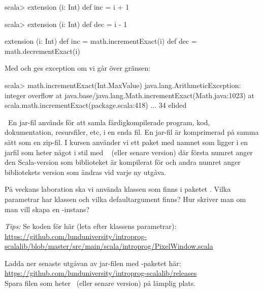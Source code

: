 \SubtaskSolved 
\begin{REPLnonum}
scala> extension (i: Int) def inc = i + 1
\end{REPLnonum}

\SubtaskSolved 
\begin{REPLnonum}
scala> extension (i: Int) def dec = i - 1
\end{REPLnonum}

\SubtaskSolved 
\begin{Code}
extension (i: Int) 
  def inc = math.incrementExact(i)
  def dec = math.decrementExact(i)
\end{Code}

\SubtaskSolved Med   och  ges exception om vi går över gränsen:
\begin{REPLnonum}
scala> math.incrementExact(Int.MaxValue)
java.lang.ArithmeticException: integer overflow
  at java.base/java.lang.Math.incrementExact(Math.java:1023)
  at scala.math.incrementExact(package.scala:418)
  ... 34 elided
\end{REPLnonum}


\QUESTEND



\QUESTBEGIN

\Task \what~En jar-fil används för att samla färdigkompilerade program, kod, dokumentation, resursfiler, etc, i en enda fil. En jar-fil är komprimerad på samma sätt som en zip-fil. I kursen använder vi ett paket med namnet  som ligger i en jarfil som heter något i stil med \LibJar~ (eller senare version) där första numret anger den Scala-version som biblioteket är kompilerat för och andra numret anger bibliotekets version som ändras vid varje ny utgåva.

\Subtask På veckans laboration ska vi använda klassen  som finns i paketet . Vilka parametrar har klassen  och vilka defaultargument finns? Hur skriver man om man vill skapa en -instans?

\emph{Tips:}  Se koden för  här (leta efter klassens parametrar): \\\url{https://github.com/lunduniversity/introprog-scalalib/blob/master/src/main/scala/introprog/PixelWindow.scala}


\Subtask Ladda ner senaste utgåvan av jar-filen med -paketet här: \\\url{https://github.com/lunduniversity/introprog-scalalib/releases}
\\ Spara filen som heter \LibJar~(eller senare version) på lämplig plats. 

